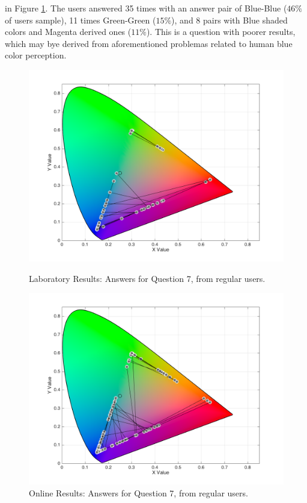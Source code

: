 in Figure \ref{fig:blueblend_2}. The users answered 35 times with an answer pair of Blue-Blue ($46\%$ of users sample), 11 times Green-Green ($15\%$),
and 8 pairs with Blue shaded colors and Magenta derived ones ($11\%$). This is a question with poorer results, which may bye derived from aforementioned
problemas related to human blue color perception.
%
\begin{figure}[!htbp]
  \centering
  \begin{minipage}{0.48\textwidth}
    \centering
    \includegraphics[width=\textwidth]{images/results/7_lab_regularUsers.png}
    \caption[Laboratory Results: Answers for Question 7, from regular users.]{Laboratory Results: Answers for Question 7, from regular users.}
    \label{fig:blueblend_1}
  \end{minipage}\hfill
  \begin{minipage}{0.48\textwidth}
    \centering
    \includegraphics[width=\textwidth]{images/results/7_online_regularUsers.png}
    \caption[Online Results: Answers for Question 7, from regular users.]{Online Results: Answers for Question 7, from regular users.}
    \label{fig:blueblend_2}
  \end{minipage}
\end{figure}
%
